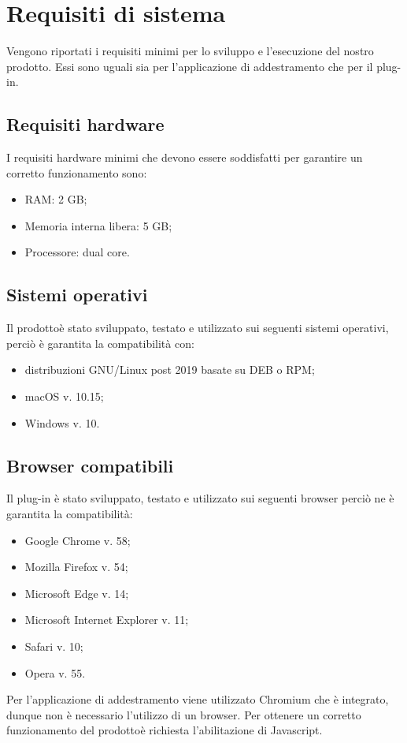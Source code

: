 \section{Requisiti di sistema}
Vengono riportati i requisiti minimi per lo sviluppo e l'esecuzione del nostro prodotto\glo. Essi sono uguali sia per l'applicazione di addestramento che per il plug-in.

\subsection{Requisiti hardware}
I requisiti hardware minimi che devono essere soddisfatti per garantire un corretto funzionamento sono:
\begin{itemize}
	\item RAM: 2 GB;
	\item Memoria interna libera: 5 GB;
	\item Processore: dual core.
\end{itemize}

\subsection{Sistemi operativi}
Il prodotto\glosp è stato sviluppato, testato e utilizzato sui seguenti sistemi operativi, perciò è garantita la compatibilità con:
\begin{itemize}
	\item distribuzioni GNU/Linux post 2019 basate su DEB o RPM;
	\item macOS v. 10.15;
	\item Windows v. 10.
\end{itemize}

\subsection{Browser compatibili}
Il plug-in è stato sviluppato, testato e utilizzato sui seguenti browser perciò ne è garantita la compatibilità:
\begin{itemize}
	\item Google Chrome v. 58;
	\item Mozilla Firefox v. 54;
	\item Microsoft Edge v. 14;
	\item Microsoft Internet Explorer v. 11;
	\item Safari v. 10;
	\item Opera v. 55.
\end{itemize}
Per l'applicazione di addestramento viene utilizzato Chromium che è integrato, dunque non è necessario l'utilizzo di un browser.
Per ottenere un corretto funzionamento del prodotto\glosp è richiesta l'abilitazione di Javascript.
